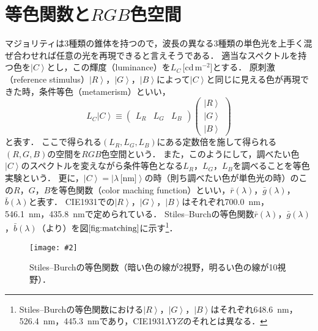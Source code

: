 \documentclass[uplatex,paper=a4,fontsize=4.0truemm,jafontsize=4.0truemm,head_space=30.0truemm,foot_space=30.0truemm,baselineskip=8.0truemm,line_length=40zw,gutter=25.0truemm,oneside,openany,fleqn,hanging_panctuation,open_bracket_pos=nibu_tentsuki,dvipdfmx,jis2004,book,titlepage]{jlreq}
\theoremstyle{mystyle}
\newcommand{\captiondot}[1]{\caption{#1．}}
\newcommand{\figureinput}[4]{\begin{figure}[tbp]\centering\texttt{[image: \#2]}\captiondot{#3}\label{fig:#4}\end{figure}}
\newcommand{\mathdisplaystyle}[1]{\(\displaystyle{#1}\)}
\newcommand{\Reference}[1]{\mathdisplaystyle{\ref{#1}}}
\newcommand{\negativevalue}[1]{{-#1}}
\newcommand{\parentheses}[1]{\left(#1\right)}
\newcommand{\Diracket}[1]{\left\lvert#1\right\rangle}
\newcommand{\easymatrix}[1]{\mathord{\begin{pmatrix}#1\end{pmatrix}}}
\begin{document}
		\section{等色関数と\mathdisplaystyle{RGB}色空間}
			マジョリティは3種類の錐体を持つので，波長の異なる3種類の単色光を上手く混ぜ合わせれば任意の光を再現できると言えそうである．
			適当なスペクトルを持つ色を\mathdisplaystyle{\Diracket{C}}とし，この輝度（luminance）を\mathdisplaystyle{L_C}\,[cd\,\mathdisplaystyle{\textrm{m}^\negativevalue{2}}]とする．
			原刺激（reference stimulus）\mathdisplaystyle{\Diracket{R}}，\mathdisplaystyle{\Diracket{G}}，\mathdisplaystyle{\Diracket{B}}によって\mathdisplaystyle{\Diracket{C}}と同じに見える色が再現できた時，条件等色（metamerism）といい，
			\begin{equation*}
				L_C\Diracket{C}\equiv \easymatrix{L_R & L_G & L_B}\easymatrix{\Diracket{R} \\ \Diracket{G} \\ \Diracket{B}}
			\end{equation*}
			と表す．
			ここで得られる\mathdisplaystyle{\parentheses{L_R,L_G,L_B}}にある定数倍を施して得られる\mathdisplaystyle{\parentheses{R,G,B}}の空間を\mathdisplaystyle{RGB}色空間という．
			また，このようにして，調べたい色\mathdisplaystyle{\Diracket{C}}のスペクトルを変えながら条件等色となる\mathdisplaystyle{L_R}，\mathdisplaystyle{L_G}，\mathdisplaystyle{L_B}を調べることを等色実験という．
			更に，\mathdisplaystyle{\Diracket{C}=\Diracket{\lambda\,\textrm{[nm]}}}の時（則ち調べたい色が単色光の時）のこの\mathdisplaystyle{R}，\mathdisplaystyle{G}，\mathdisplaystyle{B}を等色関数（color maching function）といい，\mathdisplaystyle{\bar{r}\parentheses{\lambda}}，\mathdisplaystyle{\bar{g}\parentheses{\lambda}}，\mathdisplaystyle{\bar{b}\parentheses{\lambda}}と表す．
			CIE1931での\mathdisplaystyle{\Diracket{R}}，\mathdisplaystyle{\Diracket{G}}，\mathdisplaystyle{\Diracket{B}}はそれぞれ\SI{700.0}{nm}，\SI{546.1}{nm}，\SI{435.8}{nm}で定められている．
			Stiles--Burchの等色関数\mathdisplaystyle{\bar{r}\parentheses{\lambda}}，\mathdisplaystyle{\bar{g}\parentheses{\lambda}}，\mathdisplaystyle{\bar{b}\parentheses{\lambda}}（\cite{Stiles1955,Stiles1959}より）を図\Reference{fig:matching}に示す\footnote{Stiles--Burchの等色関数における\mathdisplaystyle{\Diracket{R}}，\mathdisplaystyle{\Diracket{G}}，\mathdisplaystyle{\Diracket{B}}はそれぞれ\SI{648.6}{nm}，\SI{526.4}{nm}，\SI{445.3}{nm}であり，CIE1931\mathdisplaystyle{XYZ}のそれとは異なる．}．
			\figureinput{width=\linewidth}{D:/a/figs/RGBcmf.png}{Stiles--Burchの等色関数（暗い色の線が2\textdegree 視野，明るい色の線が10\textdegree 視野）}{matching}
\end{document}
